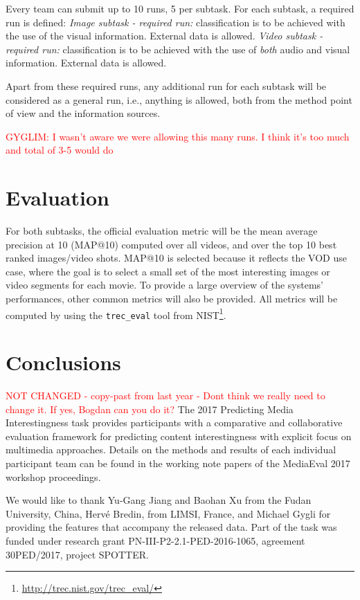 \documentclass[sigconf]{acmart-me}
\begin{document}
Every team can submit up to 10 runs, 5 per subtask. For each subtask, a required run is defined: \emph{Image subtask - required run:} classification is to be achieved with the use of the visual information. External data is allowed. \emph{Video subtask - required run:} classification is to be achieved with the use of \emph{both} audio and visual information. External data is allowed.

Apart from these required runs, any additional run for each subtask will be considered as a general run, i.e., anything is allowed, both from the method point of view and the information sources. 

\textcolor{red}{GYGLIM: I wasn't aware we were allowing this many runs. I think it's too much and total of 3-5 would do}
\section{Evaluation}

For both subtasks, the official evaluation metric will be the mean average precision at 10 (MAP@10) computed over all videos, and over the top 10 best ranked images/video shots. MAP@10 is selected because it reflects the VOD use case, where the goal is to select a small set of the most interesting images or video segments for each movie. To provide a large overview of the systems' performances, other common metrics will also be provided. All metrics will be computed by using the \texttt{trec\_eval} tool from
NIST\footnote{\url{http://trec.nist.gov/trec\_eval/}}.

\section{Conclusions}
\textcolor{red}{NOT CHANGED - copy-past from last year - Dont think we really need to change it. If yes, Bogdan can you do it?}
The 2017 Predicting Media Interestingness task provides participants
with a comparative and collaborative evaluation framework for
predicting content interestingness with explicit focus on
multimedia approaches. Details on the methods and results of each individual
participant team can be found in the working note papers of the
MediaEval 2017 workshop proceedings.

\begin{acks}
We would like to thank Yu-Gang Jiang and Baohan Xu
from the Fudan University, China, Herv\'{e} Bredin, from LIMSI,
France, and Michael Gygli for providing the features that accompany the
released data. Part of the task was funded under research grant PN-III-P2-2.1-PED-2016-1065, agreement 30PED/2017, project SPOTTER.
\end{acks}



\def\bibfont{\small} %

\end{document}
